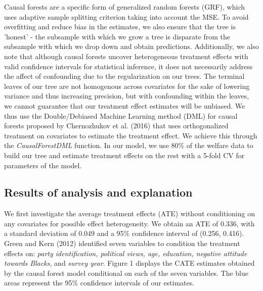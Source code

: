 \documentclass[12pt]{article}
\begin{document}
Causal forests are a specific form of generalized random forests (GRF), which uses adaptive sample splitting criterion taking into account the MSE. To avoid overfitting and reduce bias in the estimates, we also ensure that the tree is 'honest' - the subsample with which we grow a tree is disparate from the subsample with which we drop down and obtain predictions. 
Additionally, we also note that although causal forests uncover heterogeneous treatment effects with valid confidence intervals for statistical inference, it does not necessarily address the affect of confounding due to the regularization on our trees. The terminal leaves of our tree are not homogenous across covariates for the sake of lowering variance and thus increasing precision, but with confounding within the leaves, we cannot guarantee that our treatment effect estimates will be unbiased. We thus use the Double/Debiased Machine Learning method (DML) for causal forests proposed by Chernozhukov et al. (2016) that uses orthogonalized treatment on covariates to estimate the treatment effect.\cite{DML} We achieve this through the \textit{CausalForestDML} function. In our model, we use 80\% of the welfare data to build our tree and estimate treatment effects on the rest with a 5-fold CV for parameters of the model. \\ 

\subsection{Results of analysis and explanation}
We first investigate the average treatment effects (ATE) without conditioning on any covariates for possible effect heterogeneity. We obtain an ATE of 0.336, with a standard deviation of 0.049 and a 95\% confidence interval of (0.256, 0.416). Green and Kern (2012) identified seven variables to condition the treatment effects on: \textit{party identification, political views, age, education, negative attitude towards Blacks}, and \textit{survey year}. Figure 1 displays the CATE estimates obtained by the causal forest model conditional on each of the seven variables. The blue areas represent the 95\% confidence intervals of our estimates. \\
\end{document}
